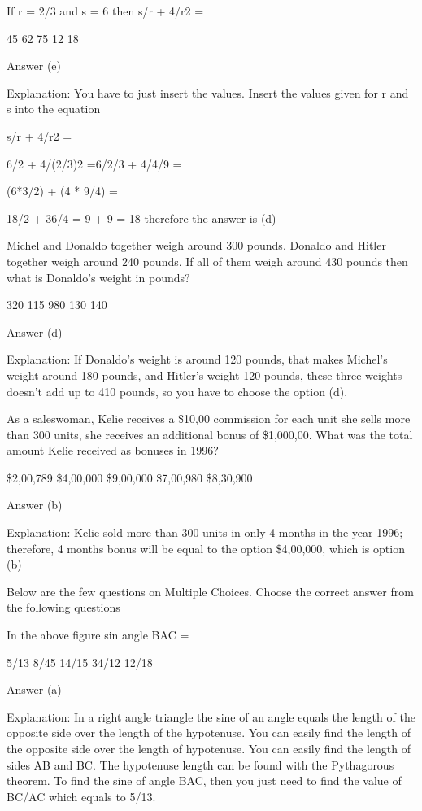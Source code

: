     If r = 2/3 and s = 6 then s/r + 4/r2 =

        45
        62
        75
        12
        18 

    Answer (e)

    Explanation: You have to just insert the values. Insert the values given for r and s into the equation

    s/r + 4/r2 =

    6/2 + 4/(2/3)2 =6/2/3 + 4/4/9 =

    (6*3/2) + (4 * 9/4) =

    18/2 + 36/4 = 9 + 9 = 18 therefore the answer is (d)

    Michel and Donaldo together weigh around 300 pounds. Donaldo and Hitler together weigh around 240 pounds. If all of them weigh around 430 pounds then what is Donaldo's weight in pounds?

        320
        115
        980
        130
        140 

    Answer (d)

    Explanation: If Donaldo's weight is around 120 pounds, that makes Michel's weight around 180 pounds, and Hitler's weight  120 pounds, these three weights doesn't add up to 410 pounds, so you have to choose the option (d).

    As a saleswoman, Kelie receives a \$10,00 commission for each unit she sells more than 300 units, she receives an additional bonus of \$1,000,00. What was the total amount Kelie received as bonuses in 1996?

        \$2,00,789
        \$4,00,000
        \$9,00,000
        \$7,00,980
        \$8,30,900 

    Answer (b)

    Explanation: Kelie sold more than 300 units in only 4 months in the year 1996; therefore, 4 months bonus will be equal to the option \$4,00,000, which is option (b) 



Below are the few questions on Multiple Choices. Choose the correct answer from the following questions

    In the above figure sin angle BAC =

        5/13
        8/45
        14/15
        34/12
        12/18 

    Answer (a)

    Explanation: In a right angle triangle the sine of an angle equals the length of the opposite side over the length of the hypotenuse. You can easily find the length of the opposite side over the length of hypotenuse. You can easily find the length of sides AB and BC. The hypotenuse length can be found with the Pythagorous theorem. To find the sine of angle BAC, then you just need to find the value of BC/AC which equals to 5/13.

